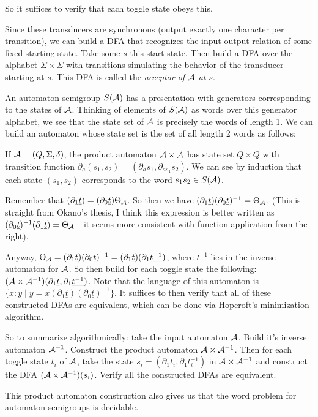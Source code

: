 \documentclass[11pt]{article}
\begin{document}
{\color{TODO}
So it suffices to verify that each toggle state obeys this.

Since these transducers are synchronous (output exactly one character
per transition), we can build a DFA that recognizes the input-output
relation of some fixed starting state. Take some $s$ this start
state. Then build a DFA over the alphabet $\Sigma \times \Sigma$ with
transitions simulating the behavior of the transducer starting at
$s$. This DFA is called the \textit{acceptor of $\mathcal{A}$ at $s$}.

An automaton semigroup $S(\mathcal{A})$ has a presentation with generators
corresponding to the states of $\mathcal{A}$. Thinking of elements of $S(\mathcal{A})$ as
words over this generator alphabet, we see that the state set of $\mathcal{A}$
is precisely the words of length 1. We can build an automaton whose
state set is the set of all length 2 words as follows:

If $\mathcal{A} = (Q, \Sigma, \delta)$, the product automaton $\mathcal{A} \times \mathcal{A}$ has
state set $Q\times Q$ with transition function
$\partial_a (s_1, s_2) = (\partial_a s_1, \partial_{a s_1} s_2)$. We
can see by induction that each state $(s_1, s_2)$ corresponds to the
word $s_1 s_2 \in S(\mathcal{A})$.

Remember that
$(\partial_1 \underline{t}) = (\partial_0 \underline{t})\Theta_{\mathcal{A}}$. So
then we have
$(\partial_1 \underline{t})(\partial_0 \underline{t})^{-1} =
\Theta_{\mathcal{A}}$. (This is straight from Okano's thesis, I think this
expression is better written as
$(\partial_0 \underline{t})^{-1}(\partial_1 \underline{t})= \Theta_{\mathcal{A}}$
- it seems more consistent with function-application-from-the-right).

Anyway, $\Theta_{\mathcal{A}} = (\partial_1 \underline{t})(\partial_0 \underline{t})^{-1} = (\partial_1 \underline{t})(\partial_1 \underline{t^{-1}})$, where $t^{-1}$ lies in the inverse automaton for $\mathcal{A}$. So then build for each toggle state the following: $(\mathcal{A}\times \mathcal{A}^{-1})(\partial_1 \underline{t}, \partial_1 \underline{t^{-1}})$. Note that the language of this automaton is $\{ x : y \mid y = x(\partial_1 \underline{t})(\partial_0 \underline{t})^{-1}\}$. It suffices to then verify that all of these constructed DFAs are equivalent, which can be done via Hopcroft's minimization algorithm.

So to summarize algorithmically: take the input automaton $\mathcal{A}$. Build
it's inverse automaton $\mathcal{A}^{-1}$. Construct the product automaton
$\mathcal{A}\times \mathcal{A}^{-1}$. Then for each toggle state $t_i$ of $\mathcal{A}$, take the
state $s_i = (\partial_1 t_i, \partial_1 t_i^{-1})$ in
$\mathcal{A}\times \mathcal{A}^{-1}$ and construct the DFA $(\mathcal{A}\times \mathcal{A}^{-1})(s_i)$. Verify
all the constructed DFAs are equivalent.


This product automaton construction also gives us that the word
problem for automaton semigroups is decidable.
} %
\end{document}
